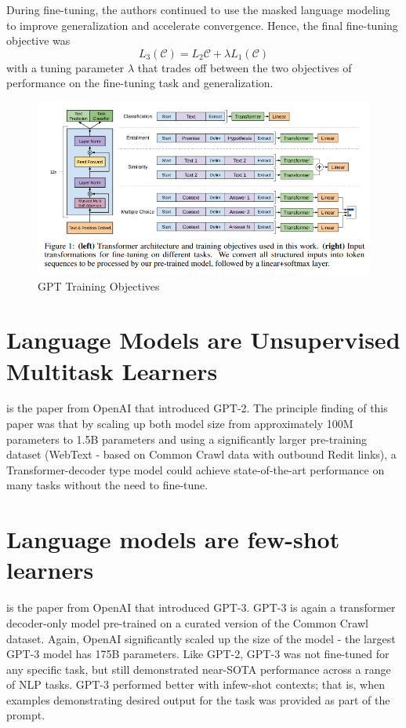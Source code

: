 \documentclass[11pt]{article}
\theoremstyle{definition}
\begin{document}
During fine-tuning, the authors continued to use the masked language modeling to improve generalization and accelerate convergence. Hence, the final fine-tuning objective was 
\begin{equation}
L_3(\mathcal{C}) = L_2{\mathcal{C}} + \lambda L_1(\mathcal{C})
\end{equation}
with a tuning parameter $\lambda$ that trades off between the two objectives of performance on the fine-tuning task and generalization.

\begin{figure}
\centering
  \includegraphics[width=\textwidth,height=\textheight,keepaspectratio]{transformers/gpt_objectives.png}
  \caption{GPT Training Objectives \cite{radford2018gpt}}
  \label{fig:gptobjectives}
\end{figure}

\section{Language Models are Unsupervised Multitask Learners \cite{radford2019gpt2}}

\cite{radford2019gpt2} is the paper from OpenAI that introduced GPT-2. The principle finding of this paper was that by scaling up both model size from approximately 100M parameters to 1.5B parameters and using a significantly larger pre-training dataset (WebText - based on Common Crawl data with outbound Redit links), a Transformer-decoder type model could achieve state-of-the-art performance on many tasks without the need to fine-tune.

\section{Language models are few-shot learners \cite{brown2020gpt3}}

\cite{brown2020gpt3} is the paper from OpenAI that introduced GPT-3. GPT-3 is again a transformer decoder-only model pre-trained on a curated version of the Common Crawl dataset. Again, OpenAI significantly scaled up the size of the model - the largest GPT-3 model has 175B parameters. Like GPT-2, GPT-3 was not fine-tuned for any specific task, but still demonstrated near-SOTA performance across a range of NLP tasks. GPT-3 performed better with infew-shot contexts; that is, when examples demonstrating desired output for the task was provided as part of the prompt.
\end{document}
